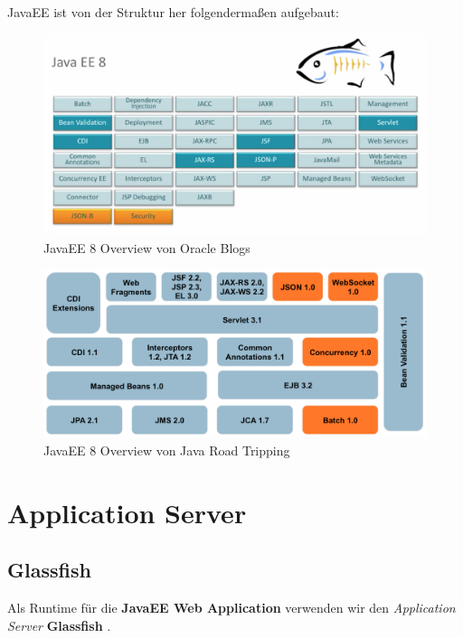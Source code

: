 JavaEE ist von der Struktur her folgendermaßen aufgebaut:

\begin{figure}
    \centering
    \includegraphics[width=\textwidth]{images/javaee-overview1}
    \caption{JavaEE 8 Overview von Oracle Blogs \cite{stackoverflow:javaee}}
\end{figure}

\begin{figure}
    \centering
    \includegraphics[width=\textwidth]{images/javaee-overview2}
    \caption{JavaEE 8 Overview von Java Road Tripping \cite{stackoverflow:javaee}}
\end{figure}

\clearpage
\section{Application Server}

\subsection{Glassfish}

Als Runtime für die \textbf{JavaEE Web Application} verwenden wir den \textit{Application Server} \textbf{Glassfish} \cite{github:glassfish}.

